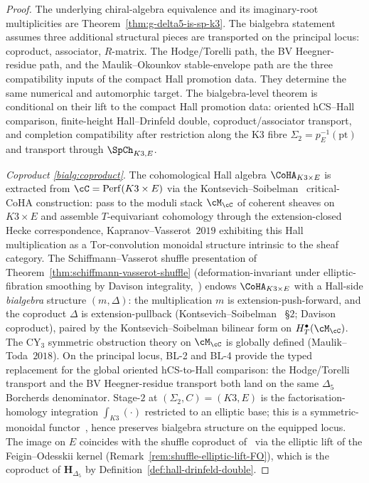\begin{proof}
The underlying chiral-algebra equivalence and its imaginary-root
multiplicities are Theorem~\ref{thm:g-delta5-is-sp-k3}. The bialgebra
statement assumes three additional structural pieces are transported on the
principal locus: coproduct, associator, $R$-matrix. The Hodge/Torelli path,
the BV Heegner-residue path, and the Maulik--Okounkov stable-envelope path
are the three compatibility inputs of the compact Hall promotion data.
They determine the same numerical and automorphic target. The bialgebra-level
theorem is conditional on their lift to the compact Hall promotion data:
oriented hCS--Hall comparison, finite-height Hall--Drinfeld double,
coproduct/associator transport, and completion compatibility after
restriction along the K3 fibre $\Sigma_2 = p_E^{-1}(\mathrm{pt})$ and
transport through $\SpCh_{K3, E}$.

\emph{Coproduct \textup{\ref{bialg:coproduct}}}.
The cohomological Hall algebra $\CoHA_{K3 \times E}$ is extracted from $\cC = \mathrm{Perf}(K3 \times E)$ via the Kontsevich--Soibelman~\cite{KS2008} critical-CoHA construction: pass to the moduli stack $\cM_\cC$ of coherent sheaves on $K3 \times E$ and assemble $T$-equivariant cohomology through the extension-closed Hecke correspondence, Kapranov--Vasserot~$2019$ \cite{KV2011} exhibiting this Hall multiplication as a $\mathrm{Tor}$-convolution monoidal structure intrinsic to the sheaf category. The Schiffmann--Vasserot shuffle presentation of Theorem~\ref{thm:schiffmann-vasserot-shuffle} (deformation-invariant under elliptic-fibration smoothing by Davison integrality,~\cite{SV13}) endows $\CoHA_{K3 \times E}$ with a Hall-side \emph{bialgebra} structure $(m, \Delta)$: the multiplication $m$ is extension-push-forward, and the coproduct $\Delta$ is extension-pullback (Kontsevich--Soibelman~\cite{KS2008} \S$2$; Davison coproduct), paired by the Kontsevich--Soibelman bilinear form on $H^\bullet_T(\cM_\cC)$. The CY$_3$ symmetric obstruction theory on $\cM_\cC$ is globally defined (Maulik--Toda~$2018$). On the principal locus, BL-2 and BL-4 provide the typed replacement for the global oriented hCS-to-Hall comparison: the Hodge/Torelli transport and the BV Heegner-residue transport both land on the same $\Delta_5$ Borcherds denominator. Stage-$2$ at $(\Sigma_2, C) = (K3, E)$ is the factorisation-homology integration $\int_{K3}(\cdot)$ restricted to an elliptic base; this is a symmetric-monoidal functor~\cite[HA~5.5.3]{LurieHA}, hence preserves bialgebra structure on the equipped locus. The image on $E$ coincides with the shuffle coproduct of~\cite{SV13} via the elliptic lift of the Feigin--Odesskii kernel (Remark~\ref{rem:shuffle-elliptic-lift-FO}), which is the coproduct of $\mathbf{H}_{\Delta_5}$ by Definition~\ref{def:hall-drinfeld-double}.


\end{proof}
